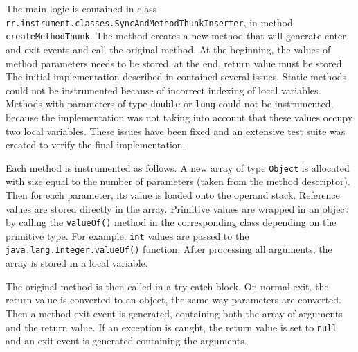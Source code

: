The main logic is contained in class 
\texttt{rr.instrument.classes.SyncAndMethodThunkInserter}, in method
\texttt{createMethodThunk}. The method creates a new method that will generate
enter and exit events and call the original method. At the beginning, the values
of method parameters needs to be stored, at the end, return value must be
stored. The initial implementation described in \cite{janousek} contained
several issues. Static methods could not be instrumented because of incorrect
indexing of local variables. Methods with parameters of type \texttt{double} or
\texttt{long} could not be instrumented, because the implementation was not
taking into account that these values occupy two local variables. These issues
have been fixed and an extensive test suite was created to verify the final
implementation.

Each method is instrumented as follows. A new array of type \texttt{Object} is
allocated with size equal to the number of parameters (taken from the method
descriptor). Then for each parameter, its value is loaded onto the operand
stack. Reference values are stored directly in the array. Primitive values are
wrapped in an object by calling the \texttt{valueOf()} method in the
corresponding class depending on the primitive type. For example, \texttt{int}
values are passed to the \texttt{java.lang.Integer.valueOf()} function. After
processing all arguments, the array is stored in a local variable.

The original method is then called in a try-catch block. On normal exit, the
return value is converted to an object, the same way parameters are converted.
Then a method exit event is generated, containing both the array of arguments
and the return value. If an exception is caught, the return value is set to
\texttt{null} and an exit event is generated containing the arguments.

